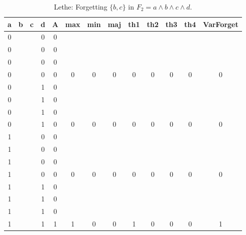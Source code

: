 \begin{table}[!tb]
    \centering
    \begin{tabular}{|c|c|c|c|c|c|c|c|c|c|c|c|c|}
        \hline
        \textbf{a} & \textbf{b} & \textbf{c} & \textbf{d} & \textbf{A} & \textbf{max} & \textbf{min} & \textbf{maj} & \textbf{th1} & \textbf{th2} & \textbf{th3} & \textbf{th4} & \textbf{VarForget} \\ \hline
        \rowcolor{gray!40} 0 &  &  & 0 & 0 &  &  &  &  &  &  &  &  \\ \hline
        \rowcolor{gray!40} 0 &  &  & 0 & 0 &  &  &  &  &  &  &  &  \\ \hline
        \rowcolor{gray!40} 0 &  &  & 0 & 0 &  &  &  &  &  &  &  &  \\ \hline
        \rowcolor{gray!40} 0 &  &  & 0 & 0 & 0 & 0 & 0 & 0 & 0 & 0 & 0 & 0 \\ \hline
        \rowcolor{blue!40} 0 &  &  & 1 & 0 &  &  &  &  &  &  &  &  \\ \hline
        \rowcolor{blue!40} 0 &  &  & 1 & 0 &  &  &  &  &  &  &  &  \\ \hline
        \rowcolor{blue!40} 0 &  &  & 1 & 0 &  &  &  &  &  &  &  &  \\ \hline
        \rowcolor{blue!40} 0 &  &  & 1 & 0 & 0 & 0 & 0 & 0 & 0 & 0 & 0 & 0 \\ \hline
        \rowcolor{red!40} 1 &  &  & 0 & 0 &  &  &  &  &  &  &  &  \\ \hline
        \rowcolor{red!40} 1 &  &  & 0 & 0 &  &  &  &  &  &  &  &  \\ \hline
        \rowcolor{red!40} 1 &  &  & 0 & 0 &  &  &  &  &  &  &  &  \\ \hline
        \rowcolor{red!40} 1 &  &  & 0 & 0 & 0 & 0 & 0 & 0 & 0 & 0 & 0 & 0 \\ \hline
        \rowcolor{green!40} 1 &  &  & 1 & 0 &  &  &  &  &  &  &  &  \\ \hline
        \rowcolor{green!40} 1 &  &  & 1 & 0 &  &  &  &  &  &  &  &  \\ \hline
        \rowcolor{green!40} 1 &  &  & 1 & 0 &  &  &  &  &  &  &  &  \\ \hline
        \rowcolor{green!40} 1 &  &  & 1 & 1 & 1 & 0 & 0 & 1 & 0 & 0 & 0 & 1 \\ \hline
    \end{tabular}
    \caption{Lethe: Forgetting $\{b, c\}$ in $F_{2} = a \land b \land c \land d$.}
    \label{tab:lethe-F2-bc}
\end{table}

